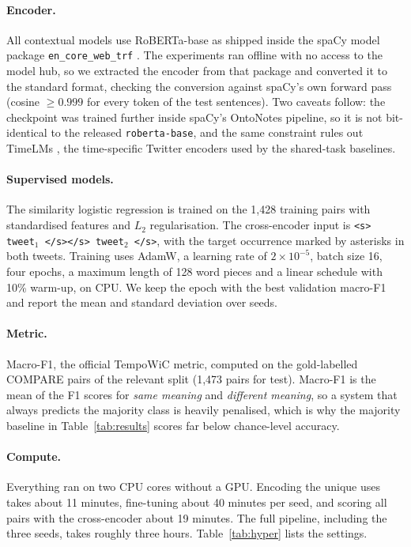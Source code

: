 \documentclass{article}
\begin{document}
\paragraph{Encoder.} All contextual models use RoBERTa-base as shipped inside the
spaCy model package \texttt{en\_core\_web\_trf} \citep{honnibal2020spacy}. The
experiments ran offline with no access to the model hub, so we extracted the
encoder from that package and converted it to the standard format, checking the
conversion against spaCy's own forward pass (cosine $\geq0.999$ for every token
of the test sentences). Two caveats follow: the checkpoint was trained further
inside spaCy's OntoNotes pipeline, so it is not bit-identical to the released
\texttt{roberta-base}, and the same constraint rules out TimeLMs
\citep{loureiro2022timelms}, the time-specific Twitter encoders used by the
shared-task baselines.

\paragraph{Supervised models.} The similarity logistic regression is trained on
the 1{,}428 training pairs with standardised features and $L_2$ regularisation.
The cross-encoder input is \texttt{<s> tweet$_1$ </s></s> tweet$_2$ </s>}, with
the target occurrence marked by asterisks in both tweets. Training uses AdamW, a
learning rate of $2\times10^{-5}$, batch size 16, four epochs, a maximum length
of 128 word pieces and a linear schedule with 10\% warm-up, on CPU. We keep the
epoch with the best validation macro-F1 and report the mean and standard
deviation over \numSeeds{} seeds.

\paragraph{Metric.} Macro-F1, the official TempoWiC metric, computed on the
gold-labelled COMPARE pairs of the relevant split (1{,}473 pairs for test).
Macro-F1 is the mean of the F1 scores for \emph{same meaning} and
\emph{different meaning}, so a system that always predicts the majority class is
heavily penalised, which is why the majority baseline in Table~\ref{tab:results}
scores far below chance-level accuracy.

\paragraph{Compute.} Everything ran on two CPU cores without a GPU. Encoding the
\numUses{} unique uses takes about 11 minutes, fine-tuning about 40 minutes per
seed, and scoring all \numTotalPairs{} pairs with the cross-encoder about 19
minutes. The full pipeline, including the three seeds, takes roughly three hours.
Table~\ref{tab:hyper} lists the settings.
\end{document}
